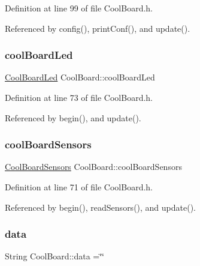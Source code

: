 Definition at line 99 of file Cool\+Board.\+h.



Referenced by config(), print\+Conf(), and update().

\mbox{\label{classCoolBoard_a1b1d3c684a5baa56b08486e192fd8e97}} 
\subsubsection{\texorpdfstring{cool\+Board\+Led}{coolBoardLed}}
{\footnotesize\ttfamily \hyperlink{classCoolBoardLed}{Cool\+Board\+Led} Cool\+Board\+::cool\+Board\+Led\hspace{0.3cm}{\ttfamily [private]}}



Definition at line 73 of file Cool\+Board.\+h.



Referenced by begin(), and update().

\mbox{\label{classCoolBoard_af102be5288bd7f7a8e59b13f86e26a00}} 
\subsubsection{\texorpdfstring{cool\+Board\+Sensors}{coolBoardSensors}}
{\footnotesize\ttfamily \hyperlink{classCoolBoardSensors}{Cool\+Board\+Sensors} Cool\+Board\+::cool\+Board\+Sensors\hspace{0.3cm}{\ttfamily [private]}}



Definition at line 71 of file Cool\+Board.\+h.



Referenced by begin(), read\+Sensors(), and update().

\mbox{\label{classCoolBoard_a427fb753dd8575bdf821c70a5c63d695}} 
\subsubsection{\texorpdfstring{data}{data}}
{\footnotesize\ttfamily String Cool\+Board\+::data =\char`\"{}\char`\"{}\hspace{0.3cm}{\ttfamily [private]}}



